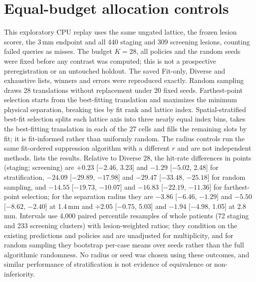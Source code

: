 \begin{table}[!t]
\centering\small
\caption{Archived exploratory TCIA status. Inc. is incident-new out of 91. FN and P res. use the 13 prior-visible marks. Res. uses all 104. Sheared scans use the same thresholds fitted to the other folds' clean cases.}
\label{tab:tcia}

\end{table}



\section{Equal-budget allocation controls}
\label{sec:alloc}
This exploratory CPU replay uses the same ungated lattice, the frozen lesion scorer, the 3\,mm endpoint and all 440 staging and 309 screening lesions, counting failed queries as misses.
The budget $K = 28$, all policies and the random seeds were fixed before any contrast was computed; this is not a prospective preregistration or an untouched holdout.
The saved Fit-only, Diverse and exhaustive lists, winners and errors were reproduced exactly.
Random sampling draws 28 translations without replacement under 20 fixed seeds.
Farthest-point selection starts from the best-fitting translation and maximizes the minimum physical separation, breaking ties by fit rank and lattice index.
Spatial-stratified best-fit selection splits each lattice axis into three nearly equal index bins, takes the best-fitting translation in each of the 27 cells and fills the remaining slots by fit; it is fit-informed rather than uniformly random.
The radius controls run the same fit-ordered suppression algorithm with a different $r$ and are not independent methods.
 lists the results.
Relative to Diverse 28, the hit-rate differences in points (staging; screening) are $+0.23$ [$-2.46$, 3.23] and $-1.29$ [$-5.02$, 2.48] for stratification, $-24.09$ [$-29.89$, $-17.98$] and $-29.47$ [$-33.48$, $-25.18$] for random sampling, and $-14.55$ [$-19.73$, $-10.07$] and $-16.83$ [$-22.19$, $-11.36$] for farthest-point selection; for the separation radius they are $-3.86$ [$-6.46$, $-1.29$] and $-5.50$ [$-8.62$, $-2.40$] at 1.4\,mm and $+2.05$ [$-0.75$, 5.03] and $-1.94$ [$-4.98$, 1.05] at 2.8\,mm.
Intervals use 4,000 paired percentile resamples of whole patients (72 staging and 233 screening clusters) with lesion-weighted ratios; they condition on the existing predictions and policies and are unadjusted for multiplicity, and for random sampling they bootstrap per-case means over seeds rather than the full algorithmic randomness.
No radius or seed was chosen using these outcomes, and similar performance of stratification is not evidence of equivalence or non-inferiority.

